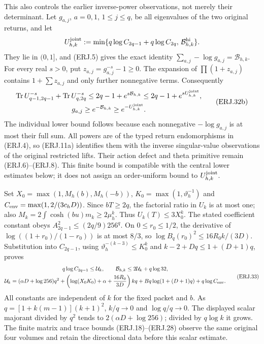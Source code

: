 This also controls the earlier inverse-power observations, not merely
their determinant. Let $g_{a,j}$, $a=0,1$, $1\le j\le q$, be all
eigenvalues of the two original returns, and let
\[
 U_{h,k}^{\rm joint}:=
 \min\{q\log C_{2q-1}+q\log C_{2q},\,
                   \mathcal B_{h,k}^{\rm hi}\}.
\]
They lie in $(0,1]$, and (ERJ.5) gives the exact identity
$\sum_{a,j}-\log g_{a,j}=\mathcal B_{h,k}$.
For every real $s>0$, put $z_{a,j}=g_{a,j}^{-s}-1\ge0$.
The expansion of $\prod(1+z_{a,j})$ contains $1+\sum z_{a,j}$
and only further nonnegative terms. Consequently
\[
 \begin{gathered}
 \operatorname{Tr}U_{q-1,2q-1}^{-s}
       +\operatorname{Tr}U_{q,2q}^{-s}
 \le 2q-1+e^{s\mathcal B_{h,k}}
 \le 2q-1+e^{sU_{h,k}^{\rm joint}},\\
 g_{a,j}\ge e^{-\mathcal B_{h,k}}\ge e^{-U_{h,k}^{\rm joint}}.
 \end{gathered}\tag{ERJ.32b}\label{erj:metric-powers}
\]
The individual lower bound follows because each nonnegative
$-\log g_{a,j}$ is at most their full sum. All powers are of the
typed return endomorphisms in (ERJ.4), so (ERJ.11a) identifies them
with the inverse singular-value observations of the original restricted
lifts. Their action defect and theta primitive remain (ERJ.6)--(ERJ.8).
This finite bound is compatible with the central lower estimates below;
it does not assign an order-uniform bound to $U_{h,k}^{\rm joint}$.

Set $X_0=\max(1,M_h(b),M_h(-b))$,
$K_0=\max(1,\vartheta_h^{-1})$ and
$C_{\rm env}=\max(1,2/(3c_hD))$. Since $bT\ge2q$,
the factorial ratio in $U_k$ is at most one; also
$M_k=2\int\cosh(bu)m_k\ge2\mu_h^k$. Thus $U_k(T)\le3X_0^k$.
The stated coefficient constant obeys
$A_{2q-1}^2\le(2q/9)256^q$. On $0\le r_0\le1/2$,
the derivative of $\log((1+r_0)/(1-r_0))$ is at most $8/3$,
so $\log B_q(r_0)^2\le16R_0k/(3D)$.
Substitution into $C_{2q-1}$, using
$\vartheta_h^{-(k-3)}\le K_0^k$ and
$k-2+Dq\le1+(D+1)q$, proves
\[
\begin{gathered}
 q\log C_{2q-1}\le\mathcal U_k,\qquad
 \mathcal B_{h,k}\le2\mathcal U_k+q\log32,\\
 \mathcal U_k=(\alpha D+\log256)q^2
 +\left(\log(X_0K_0)+\alpha+\frac{16R_0}{3D}\right)kq
 +Bq\log(1+(D+1)q)+q\log C_{\rm env}.
\end{gathered}\tag{ERJ.33}
\]
All constants are independent of $k$ for the fixed packet and $b$.
As $q=[1+k(m-1)](k+1)^2$, $k/q\to0$ and $\log q/q\to0$.
The displayed scalar majorant divided by $q^2$ tends to
$2(\alpha D+\log256)$; divided by $q\log k$ it grows.
The finite matrix and trace bounds (ERJ.18)--(ERJ.28) observe the
same original four volumes and retain the directional data before
this scalar estimate.

